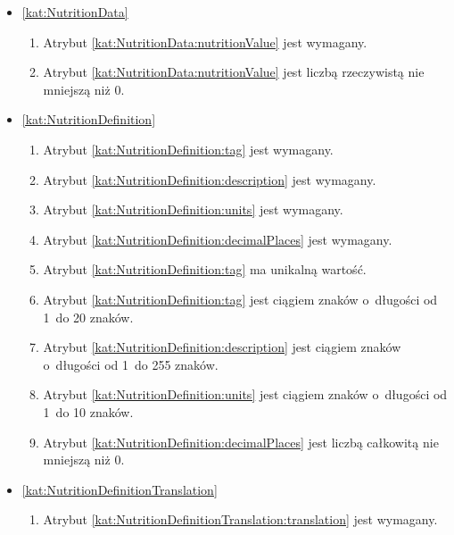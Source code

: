 \begin{itemize}[label={\textbf{Ograniczenia dla}}, wide, labelwidth=!, labelindent=0pt]
    \item\ref{kat:NutritionData}\mynobreakpar
    \begin{enumerate}[label={\textbf{OGR/2/\protect\twodigits{\arabic{enumi}}}}, wide, labelwidth=!, align=left, leftmargin=3cm, resume]
        \item Atrybut \ref{kat:NutritionData:nutritionValue} jest wymagany.

        \item Atrybut \ref{kat:NutritionData:nutritionValue} jest liczbą rzeczywistą nie mniejszą niż 0.
    \end{enumerate}

    \item\ref{kat:NutritionDefinition}\mynobreakpar
    \begin{enumerate}[label={\textbf{OGR/2/\protect\twodigits{\arabic{enumi}}}}, wide, labelwidth=!, align=left, leftmargin=3cm, resume]
        \item Atrybut \ref{kat:NutritionDefinition:tag} jest wymagany.
        \item Atrybut \ref{kat:NutritionDefinition:description} jest wymagany.
        \item Atrybut \ref{kat:NutritionDefinition:units} jest wymagany.
        \item Atrybut \ref{kat:NutritionDefinition:decimalPlaces} jest wymagany.

        \item Atrybut \ref{kat:NutritionDefinition:tag} ma unikalną wartość.

        \item Atrybut \ref{kat:NutritionDefinition:tag} jest ciągiem znaków o~długości od 1~do 20 znaków.
        \item Atrybut \ref{kat:NutritionDefinition:description} jest ciągiem znaków o~długości od 1~do 255 znaków.
        \item Atrybut \ref{kat:NutritionDefinition:units} jest ciągiem znaków o~długości od 1~do 10 znaków.
        \item Atrybut \ref{kat:NutritionDefinition:decimalPlaces} jest liczbą całkowitą nie mniejszą niż 0.
    \end{enumerate}

    \item\ref{kat:NutritionDefinitionTranslation}\mynobreakpar
    \begin{enumerate}[label={\textbf{OGR/2/\protect\twodigits{\arabic{enumi}}}}, wide, labelwidth=!, align=left, leftmargin=3cm, resume]
        \item Atrybut \ref{kat:NutritionDefinitionTranslation:translation} jest wymagany.


\end{enumerate}
\end{itemize}
